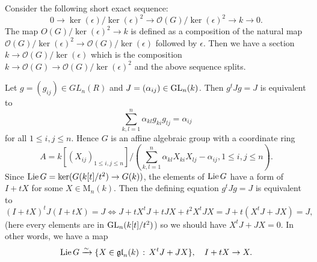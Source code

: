 \begin{problem}
Consider the following short exact sequence:
$$
    0 \to \ker(\epsilon) / \ker(\epsilon)^{2} \to \mathcal{O}(G) / \ker(\epsilon)^{2} \to k \to 0.
$$
The map $O(G) / \ker(\epsilon)^{2} \to k$ is defined as a composition of the natural map $\mathcal{O}(G)/\ker(\epsilon)^{2} \to \mathcal{O}(G)/\ker(\epsilon)$
followed by $\epsilon$.
Then we have a section $k \to \mathcal{O}(G)/\ker(\epsilon)$ which is the composition $k \to \mathcal{O}(G) \to \mathcal{O}(G)/\ker(\epsilon)^{2}$ and the above sequence splits.
\end{problem}

\begin{problem}
Let $g = (g_{ij}) \in GL_{n}(R)$ and $J = (\alpha_{ij}) \in \operatorname{\mathrm{GL}}_{n}(k)$.
Then $g^{t}Jg = J$ is equivalent to
$$
    \sum_{k, l = 1}^{n} \alpha_{kl}g_{ki}g_{lj} = \alpha_{ij}
$$
for all $1\leq i, j \leq n$.
Hence $G$ is an affine algebraic group with a coordinate ring
$$
A = k[(X_{ij})_{1\leq i, j \leq n}]/\left(\sum_{k, l =1}^{n} \alpha_{kl}X_{ki}X_{lj} - \alpha_{ij}, 1\leq i, j \leq n\right).
$$
Since $\operatorname{\mathrm{Lie}} G = \ker(G(k[t]/t^{2}) \to G(k))$, the elements of $\operatorname{\mathrm{Lie}} G$ have a form of $I + tX$ for some $X\in \mathrm{M}_{n}(k)$.
Then the defining equation $g^{t}Jg = J$ is equivalent to
$$
    (I + tX)^{t}J(I + tX) = J \Leftrightarrow J + tX^{t}J + tJX + t^{2}X^{t}JX = J + t(X^{t}J + JX) = J,
$$
(here every elements are in $\operatorname{\mathrm{GL}}_{n}(k[t]/t^{2})$) so we should have $X^{t}J + JX = 0$.
In other words, we have a map
$$
\operatorname{\mathrm{Lie}} G \xrightarrow{\sim} \{X \in \mathfrak{gl}_{n}(k)\,:\, X^{t}J + JX\}, \quad I + tX \to X.
$$
\end{problem}

\begin{problem} \notfinish
\end{problem}

\begin{problem} \notfinish
\end{problem}


